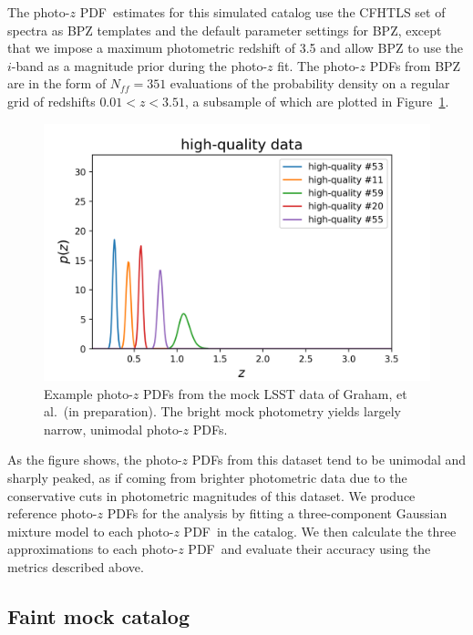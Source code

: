 \documentclass[\docopts]{\docclass}
\newcommand{\pz}{photo-$z$ PDF}
\newcommand{\mgdata}{bright\xspace}
\newcommand{\Ssdata}{Faint\xspace}
\begin{document}
The \pz\ estimates for this simulated catalog use the CFHTLS set of spectra 
\citep{ilbert_accurate_2006} as BPZ templates and the default parameter 
settings for BPZ, except that we impose a maximum photometric redshift of 3.5 
and allow BPZ to use the $i$-band as a magnitude prior during the photo-$z$ fit.
The \pz s from BPZ are in the form of $N_{ff} = 351$ evaluations of the 
probability density on a regular grid of redshifts $0.01 < z < 3.51$, a 
subsample of which are plotted in Figure~\ref{fig:graham_pzs}.

\begin{figure}
  \begin{center}
    \includegraphics[width=\columnwidth]{figures/graham_pzs.png}
    \caption{Example \pz s from the mock LSST data of Graham, et al.\ (in 
preparation).
    The \mgdata mock photometry yields largely narrow, unimodal \pz s.
    \label{fig:graham_pzs}}
  \end{center}
\end{figure}

As the figure shows, the \pz s from this dataset tend to be unimodal and 
sharply peaked, as if coming from brighter photometric data due to the 
conservative cuts in photometric magnitudes of this dataset.
We produce reference \pz s for the analysis by fitting a three-component 
Gaussian mixture model to each \pz\ in the catalog.
We then calculate the three approximations to each \pz\ and evaluate their 
accuracy using the metrics described above.

\subsection{\Ssdata mock catalog}
\label{sec:schmidt}
\end{document}

